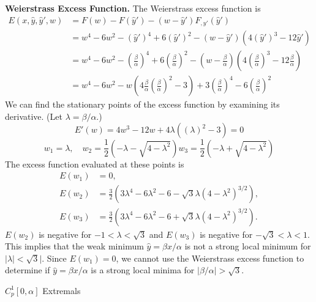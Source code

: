 \begin{Solution}
\begin{description}
    \textbf{Weierstrass Excess Function.}
    The Weierstrass excess function is
    \begin{align*}
      E(x,\hat{y},\hat{y}',w)
      &= F(w) - F(\hat{y}') - (w - \hat{y}') F_{,y'}(\hat{y}') \\
      &= w^4 - 6 w^2 - (\hat{y}')^4 + 6 (\hat{y}')^2 - 
      (w - \hat{y}') (4 (\hat{y}')^3 - 12 \hat{y}') \\
      &= w^4 - 6 w^2 - \left( \frac{\beta}{\alpha} \right)^4 
      + 6 \left( \frac{\beta}{\alpha} \right)^2 - 
      (w - \frac{\beta}{\alpha} ) (4 \left( \frac{\beta}{\alpha} \right)^3 
      - 12 \frac{\beta}{\alpha}) \\
      &= w^4 - 6 w^2 
      - w \left(4 \frac{\beta}{\alpha} \left( \frac{\beta}{\alpha} \right)^2 
        - 3 \right) 
      + 3 \left( \frac{\beta}{\alpha} \right)^4 
      - 6 \left( \frac{\beta}{\alpha} \right)^2 
    \end{align*}
    We can find the stationary points of the excess function by examining its
    derivative.  (Let $\lambda = \beta/\alpha$.)
    \[
    E'(w) = 4 w^3 - 12 w + 4 \lambda \left( 
      \left( \lambda \right)^2 - 3 \right) = 0
    \]
    \[
    w_1 = \lambda, \quad
    w_2 = \frac{1}{2} \left( -\lambda - \sqrt{ 4 - \lambda^2 } \right)
    w_3 = \frac{1}{2} \left( -\lambda + \sqrt{ 4 - \lambda^2 } \right)
    \]
    The excess function evaluated at these points is
    \begin{align*}
      E(w_1) &= 0, \\
      E(w_2) &= \frac{3}{2} \left( 3 \lambda^4 - 6 \lambda^2 - 6 - \sqrt{3} 
        \lambda (4 - \lambda^2)^{3/2} \right), \\
      E(w_3) &= \frac{3}{2} \left( 3 \lambda^4 - 6 \lambda^2 - 6 + \sqrt{3} 
        \lambda (4 - \lambda^2)^{3/2} \right).
    \end{align*}
    $E(w_2)$ is negative for $-1 < \lambda < \sqrt{3}$ and $E(w_3)$ is negative
    for $-\sqrt{3} < \lambda < 1$.  This implies that the weak minimum
    $\hat{y} = \beta x / \alpha$ is not a strong local minimum for 
    $|\lambda| < \sqrt{3}|$.  Since $E(w_1) = 0$, we cannot use the 
    Weierstrass excess function to determine if $\hat{y} = \beta x / \alpha$
    is a strong local minima for $|\beta / \alpha| > \sqrt{3}$.
  \item{$C^1_p[0,\alpha]$ Extremals}


\end{description}
\end{Solution}
